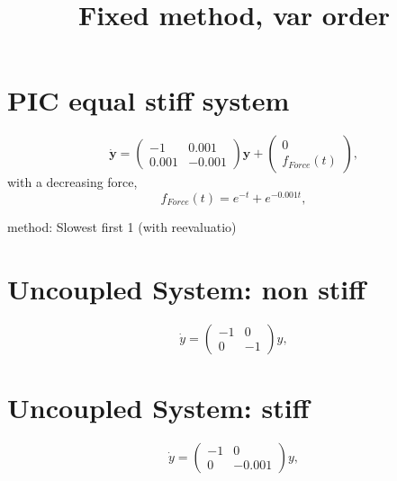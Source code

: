 \documentclass[a4paper,10pt]{article}
\title{Fixed method, var order}
\author{}
\begin{document}
\maketitle

\section{PIC equal stiff system}
\begin{equation}
 \dot{\textbf{y}} = \left(
        \begin{array}{cc}
           -1 & 0.001\\
           0.001  & -0.001
        \end{array}
     \right) \textbf{y} + \left(
        \begin{array}{c}
           0 \\
           f_{Force}(t)
        \end{array}
     \right),
\label{ExtForceStiff}
\end{equation}
with a decreasing force,
\begin{equation}
 f_{Force}(t) = e^{-t} + e^{-0.001t},
\end{equation}

method: Slowest first 1 (with reevaluatio)\\




\section{Uncoupled System: non stiff}
\begin{equation}
 \dot{y}= \left( 
        \begin{array}{cc}
           -1 & 0 \\
            0 & -1
        \end{array}
     \right) y,
\end{equation}


\section{Uncoupled System: stiff}
\begin{equation}
 \dot{y}= \left( 
        \begin{array}{cc}
           -1 & 0 \\
            0 & -0.001
        \end{array}
     \right) y,
\end{equation}
\end{document}
